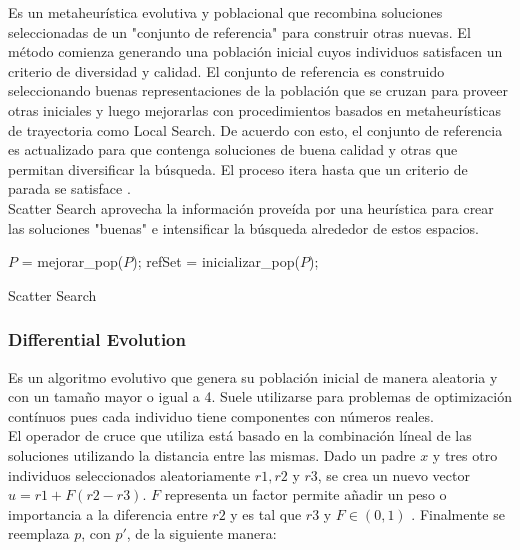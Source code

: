 \documentclass{ci5652}
\begin{document}
Es un metaheurística evolutiva y poblacional que recombina soluciones
seleccionadas de un "conjunto de referencia" para construir otras nuevas. El
método comienza generando una población inicial cuyos individuos satisfacen un
criterio de diversidad y calidad. El conjunto de referencia es construido
seleccionando buenas representaciones de la población que se cruzan para proveer
otras iniciales y luego mejorarlas con procedimientos basados en metaheurísticas
de trayectoria como Local Search. De acuerdo con esto, el conjunto de referencia
es actualizado para que contenga soluciones de buena calidad y otras que
permitan diversificar la búsqueda. El proceso itera hasta que un criterio de
parada se satisface \cite{Talbi_2009}.\\

Scatter Search aprovecha la información proveída por una heurística para crear
las soluciones "buenas" e intensificar la búsqueda alrededor de estos espacios.

\begin{algorithm}
 \DontPrintSemicolon
 \vspace*{0.1cm}
  $P$ = mejorar\_pop($P$);\;
  refSet = inicializar\_pop($P$);\;
 \vspace*{0.1cm}
 \caption{Scatter Search}
\end{algorithm}


\subsubsection{Differential Evolution}

Es un algoritmo evolutivo que genera su población inicial de manera aleatoria y
con un tamaño mayor o igual a 4. Suele utilizarse para problemas de optimización
contínuos pues cada individuo tiene componentes con números reales.\\

El operador de cruce que utiliza está basado en la combinación líneal de las
soluciones utilizando la distancia entre las mismas. Dado un padre $x$ y tres
otro individuos seleccionados aleatoriamente $r1, r2$ y $r3$, se crea un nuevo
vector $u = r1 + F(r2 - r3)$. $F$ representa un factor permite añadir un peso o
importancia a la diferencia entre $r2$ y es tal que $r3$ y $F \in (0, 1)$
\cite{Glover_2003}. Finalmente se reemplaza $p$, con $p'$, de la
siguiente manera:
\end{document}

